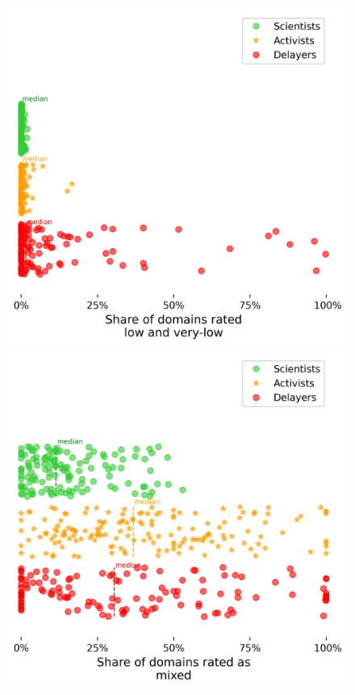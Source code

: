 \documentclass{article}
\begin{document}
\begin{figure}[ht] \label{ fig7} 
  \begin{minipage}[b]{0.3\linewidth}
  \centering
    \includegraphics[width=.8\linewidth]{../figures/negative_rating_climate_agg_2022_07_29.jpg} 
    \caption{} 
  \end{minipage} 
  \begin{minipage}[b]{0.3\linewidth}
  \centering
    \includegraphics[width=.8\linewidth]{../figures/mix_rating_climate_agg_2022_07_29.jpg} 
    \caption{} 
  \end{minipage} 
  \begin{minipage}[b]{0.3\linewidth}

\end{minipage}
\end{figure}
\end{document}

